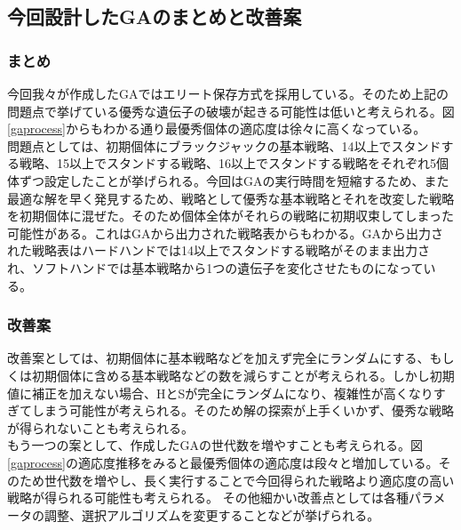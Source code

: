 \subsection{今回設計したGAのまとめと改善案}
\subsubsection{まとめ}
今回我々が作成したGAではエリート保存方式を採用している。そのため上記の問題点で挙げている優秀な遺伝子の破壊が起きる可能性は低いと考えられる。図\ref{gaprocess}からもわかる通り最優秀個体の適応度は徐々に高くなっている。\\
問題点としては、初期個体にブラックジャックの基本戦略、14以上でスタンドする戦略、15以上でスタンドする戦略、16以上でスタンドする戦略をそれぞれ5個体ずつ設定したことが挙げられる。今回はGAの実行時間を短縮するため、また最適な解を早く発見するため、戦略として優秀な基本戦略とそれを改変した戦略を初期個体に混ぜた。そのため個体全体がそれらの戦略に初期収束してしまった可能性がある。これはGAから出力された戦略表からもわかる。GAから出力された戦略表はハードハンドでは14以上でスタンドする戦略がそのまま出力され、ソフトハンドでは基本戦略から1つの遺伝子を変化させたものになっている。


\subsubsection{改善案}
改善案としては、初期個体に基本戦略などを加えず完全にランダムにする、もしくは初期個体に含める基本戦略などの数を減らすことが考えられる。しかし初期値に補正を加えない場合、HとSが完全にランダムになり、複雑性が高くなりすぎてしまう可能性が考えられる。そのため解の探索が上手くいかず、優秀な戦略が得られないことも考えられる。\\
もう一つの案として、作成したGAの世代数を増やすことも考えられる。図\ref{gaprocess}の適応度推移をみると最優秀個体の適応度は段々と増加している。そのため世代数を増やし、長く実行することで今回得られた戦略より適応度の高い戦略が得られる可能性も考えられる。
その他細かい改善点としては各種パラメータの調整、選択アルゴリズムを変更することなどが挙げられる。
